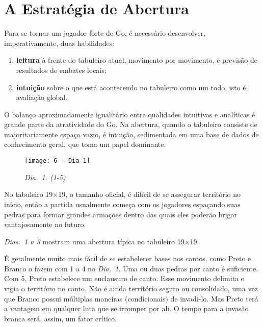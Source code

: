\chapter{A Estratégia de Abertura}\label{chap:6:estrat_abertura}

Para se tornar um jogador forte de Go, é necessário desenvolver, imperativamente, duas habilidades:

\vspace{.25cm}

\begin{enumerate}[leftmargin=1.5cm,rightmargin=1cm]
    \item \textbf{leitura} à frente do tabuleiro atual, movimento por movimento, e previsão de resultados de embates locais;
    \item \textbf{intuição} sobre o que está acontecendo no tabuleiro como um todo, isto é, avaliação global.
\end{enumerate}

\vspace{.25cm}

O balanço aproximadamente igualitário entre qualidades intuitivas e analíticas é grande parte da atratividade do Go. Na abertura, quando o tabuleiro consiste de majoritariamente espaço vazio, é intuição, sedimentada em uma base de dados de conhecimento geral, que toma um papel dominante.

\begin{wrapfigure}{r}{60mm}
    \vspace{-30pt}
    \begin{center}
        \texttt{[image: 6 - Dia 1]}
        \captionsetup{justification=centering}
        \caption*{\emph{Dia.\@~1. (1-5)}}
    \end{center}
    \vspace{-20pt}
\end{wrapfigure}

No tabuleiro 19$\times$19, o tamanho oficial, é difícil de se assegurar território no início, então a partida usualmente começa com os jogadores espaçando suas pedras para formar grandes armações dentro das quais eles poderão brigar vantajosamente no futuro.

\emph{Dias.\@~1 a 3} mostram uma abertura típica no tabuleiro 19$\times$19.

É geralmente muito mais fácil de se estabelecer bases nos cantos, como Preto e Branco o fazem com 1 a 4 no \emph{Dia.\@~1}. Uma ou duas pedras por canto é suficiente. Com 5, Preto estabelece um enclausuro de canto. Esse movimento delimita e vigia o território no canto. Não é ainda território seguro ou consolidado, uma vez que Branco possui múltiplas maneiras (condicionais) de invadi-lo. Mas Preto terá a vantagem em qualquer luta que se irromper por ali. O tempo para a invasão branca será, assim, um fator crítico.

